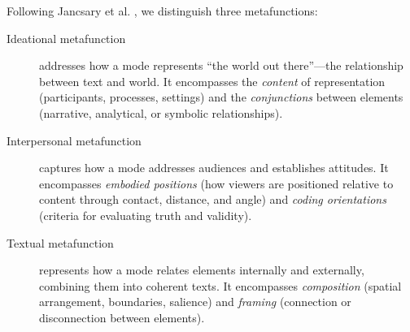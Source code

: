 \documentclass[../main.tex]{subfiles}
\begin{document}
Following Jancsary et al. \cite{jancsary2018institutions}, we distinguish three metafunctions:

\begin{description}
    \item[Ideational metafunction] addresses how a mode represents ``the world out there''---the relationship between text and world. It encompasses the \textit{content} of representation (participants, processes, settings) and the \textit{conjunctions} between elements (narrative, analytical, or symbolic relationships).

    \item[Interpersonal metafunction] captures how a mode addresses audiences and establishes attitudes. It encompasses \textit{embodied positions} (how viewers are positioned relative to content through contact, distance, and angle) and \textit{coding orientations} (criteria for evaluating truth and validity).

    \item[Textual metafunction] represents how a mode relates elements internally and externally, combining them into coherent texts. It encompasses \textit{composition} (spatial arrangement, boundaries, salience) and \textit{framing} (connection or disconnection between elements).
\end{description}
\end{document}
